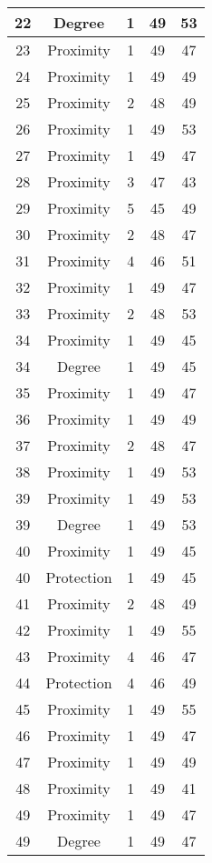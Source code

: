 \documentclass[results.tex]{subfiles}
\begin{document}
\begin{center}
\begin{tabular}{| c || c | c | c | c |}
    \hline
    22 & Degree & 1 & 49 & 53 \\ 
    \hline
    23 & Proximity & 1 & 49 & 47 \\ 
    \hline
    24 & Proximity & 1 & 49 & 49 \\ 
    \hline
    25 & Proximity & 2 & 48 & 49 \\ 
    \hline
    26 & Proximity & 1 & 49 & 53 \\ 
    \hline
    27 & Proximity & 1 & 49 & 47 \\ 
    \hline
    28 & Proximity & 3 & 47 & 43 \\ 
    \hline
    29 & Proximity & 5 & 45 & 49 \\ 
    \hline
    30 & Proximity & 2 & 48 & 47 \\ 
    \hline
    31 & Proximity & 4 & 46 & 51 \\ 
    \hline
    32 & Proximity & 1 & 49 & 47 \\ 
    \hline
    33 & Proximity & 2 & 48 & 53 \\ 
    \hline
    34 & Proximity & 1 & 49 & 45 \\ 
    \hline
    34 & Degree & 1 & 49 & 45 \\ 
    \hline
    35 & Proximity & 1 & 49 & 47 \\ 
    \hline
    36 & Proximity & 1 & 49 & 49 \\ 
    \hline
    37 & Proximity & 2 & 48 & 47 \\ 
    \hline
    38 & Proximity & 1 & 49 & 53 \\ 
    \hline
    39 & Proximity & 1 & 49 & 53 \\ 
    \hline
    39 & Degree & 1 & 49 & 53 \\ 
    \hline
    40 & Proximity & 1 & 49 & 45 \\ 
    \hline
    40 & Protection & 1 & 49 & 45 \\ 
    \hline
    41 & Proximity & 2 & 48 & 49 \\ 
    \hline
    42 & Proximity & 1 & 49 & 55 \\ 
    \hline
    43 & Proximity & 4 & 46 & 47 \\ 
    \hline
    44 & Protection & 4 & 46 & 49 \\ 
    \hline
    45 & Proximity & 1 & 49 & 55 \\ 
    \hline
    46 & Proximity & 1 & 49 & 47 \\ 
    \hline
    47 & Proximity & 1 & 49 & 49 \\ 
    \hline
    48 & Proximity & 1 & 49 & 41 \\ 
    \hline
    49 & Proximity & 1 & 49 & 47 \\ 
    \hline
    49 & Degree & 1 & 49 & 47 \\ 
    \hline   \end{tabular}
\end{center}
\end{document}
